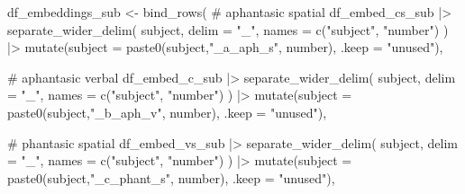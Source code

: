 \documentclass[
  authoryear]{elsarticle}
\newenvironment{Shaded}{\begin{snugshade}}{\end{snugshade}}
\newcommand{\AttributeTok}[1]{\textcolor[rgb]{0.40,0.45,0.13}{#1}}
\newcommand{\CommentTok}[1]{\textcolor[rgb]{0.37,0.37,0.37}{#1}}
\newcommand{\FunctionTok}[1]{\textcolor[rgb]{0.28,0.35,0.67}{#1}}
\newcommand{\NormalTok}[1]{\textcolor[rgb]{0.00,0.23,0.31}{#1}}
\newcommand{\OtherTok}[1]{\textcolor[rgb]{0.00,0.23,0.31}{#1}}
\newcommand{\SpecialCharTok}[1]{\textcolor[rgb]{0.37,0.37,0.37}{#1}}
\newcommand{\StringTok}[1]{\textcolor[rgb]{0.13,0.47,0.30}{#1}}
\begin{document}
\begin{Shaded}
\begin{Highlighting}[]
\NormalTok{df\_embeddings\_sub }\OtherTok{\textless{}{-}}
  \FunctionTok{bind\_rows}\NormalTok{(}
    \CommentTok{\# aphantasic spatial}
\NormalTok{    df\_embed\_cs\_sub }\SpecialCharTok{|\textgreater{}} 
      \FunctionTok{separate\_wider\_delim}\NormalTok{(}
\NormalTok{        subject,}
        \AttributeTok{delim =} \StringTok{"\_"}\NormalTok{,}
        \AttributeTok{names =} \FunctionTok{c}\NormalTok{(}\StringTok{"subject"}\NormalTok{, }\StringTok{"number"}\NormalTok{)}
\NormalTok{      ) }\SpecialCharTok{|\textgreater{}} 
      \FunctionTok{mutate}\NormalTok{(}\AttributeTok{subject =} \FunctionTok{paste0}\NormalTok{(subject,}\StringTok{"\_a\_aph\_s"}\NormalTok{, number), }\AttributeTok{.keep =} \StringTok{"unused"}\NormalTok{),}
    
    \CommentTok{\# aphantasic verbal}
\NormalTok{    df\_embed\_c\_sub  }\SpecialCharTok{|\textgreater{}}
      \FunctionTok{separate\_wider\_delim}\NormalTok{(}
\NormalTok{        subject,}
        \AttributeTok{delim =} \StringTok{"\_"}\NormalTok{,}
        \AttributeTok{names =} \FunctionTok{c}\NormalTok{(}\StringTok{"subject"}\NormalTok{, }\StringTok{"number"}\NormalTok{)}
\NormalTok{      ) }\SpecialCharTok{|\textgreater{}} 
      \FunctionTok{mutate}\NormalTok{(}\AttributeTok{subject =} \FunctionTok{paste0}\NormalTok{(subject,}\StringTok{"\_b\_aph\_v"}\NormalTok{, number), }\AttributeTok{.keep =} \StringTok{"unused"}\NormalTok{),}
    
    \CommentTok{\# phantasic spatial}
\NormalTok{    df\_embed\_vs\_sub  }\SpecialCharTok{|\textgreater{}}
      \FunctionTok{separate\_wider\_delim}\NormalTok{(}
\NormalTok{        subject,}
        \AttributeTok{delim =} \StringTok{"\_"}\NormalTok{,}
        \AttributeTok{names =} \FunctionTok{c}\NormalTok{(}\StringTok{"subject"}\NormalTok{, }\StringTok{"number"}\NormalTok{)}
\NormalTok{      ) }\SpecialCharTok{|\textgreater{}} 
      \FunctionTok{mutate}\NormalTok{(}\AttributeTok{subject =} \FunctionTok{paste0}\NormalTok{(subject,}\StringTok{"\_c\_phant\_s"}\NormalTok{, number), }\AttributeTok{.keep =} \StringTok{"unused"}\NormalTok{),}
    

\end{Highlighting}
\end{Shaded}
\end{document}
